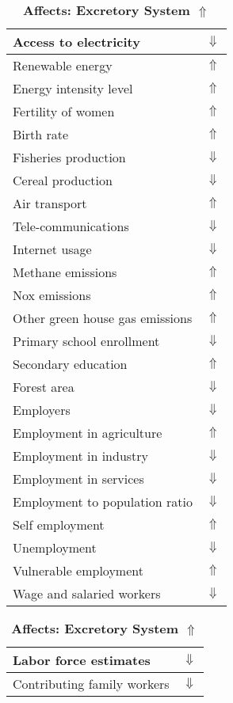 \documentclass[12pt,notitlepage,oneside]{report}
\begin{document}
\begin{table}[!htb]
\caption{\textbf{Affects: Excretory System $\Uparrow$}}
\centering
\label{Correlated Socio-economic Factors0}
\begin{tabular}{|l|l|}
\hline
Access to electricity & $\Downarrow$\\ \hline
Renewable energy & $\Uparrow$\\ \hline
Energy intensity level & $\Uparrow$\\ \hline
Fertility of women & $\Uparrow$\\ \hline
Birth rate & $\Uparrow$\\ \hline
Fisheries production & $\Downarrow$\\ \hline
Cereal production & $\Downarrow$\\ \hline
Air transport  & $\Uparrow$\\ \hline
Tele-communications & $\Downarrow$\\ \hline
Internet usage & $\Downarrow$\\ \hline
Methane emissions & $\Uparrow$\\ \hline
Nox emissions & $\Uparrow$\\ \hline
Other green house gas emissions & $\Uparrow$\\ \hline
Primary school enrollment & $\Downarrow$\\ \hline
Secondary education & $\Uparrow$\\ \hline
Forest area & $\Downarrow$\\ \hline
Employers & $\Downarrow$\\ \hline
Employment in agriculture & $\Uparrow$\\ \hline
Employment in industry & $\Downarrow$\\ \hline
Employment in services & $\Downarrow$\\ \hline
Employment to population ratio & $\Downarrow$\\ \hline
Self employment & $\Uparrow$\\ \hline
Unemployment & $\Downarrow$\\ \hline
Vulnerable employment & $\Uparrow$\\ \hline
Wage and salaried workers & $\Downarrow$\\ \hline
\end{tabular}
\begin{tabular}{|l|l|}
\hline
Labor force estimates & $\Downarrow$\\ \hline
Contributing family workers & $\Downarrow$\\ \hline

\end{tabular}
\end{table}
\end{document}
